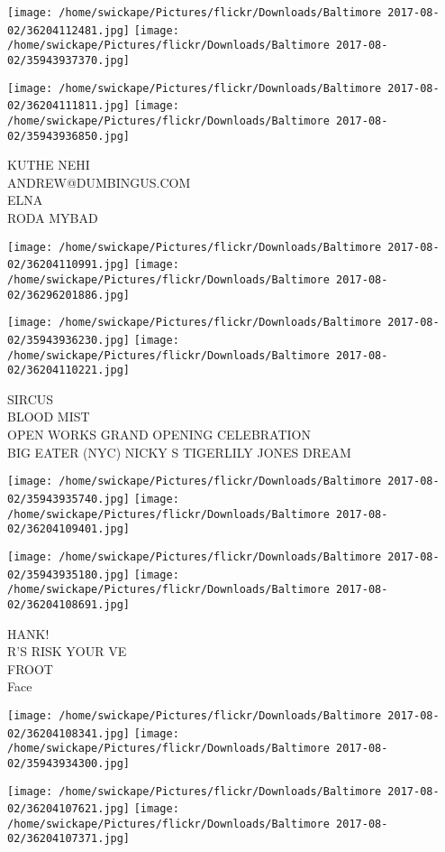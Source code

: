 \documentclass[10pt,letterpaper]{article}
\begin{document}
\texttt{[image: /home/swickape/Pictures/flickr/Downloads/Baltimore 2017-08-02/36204112481.jpg]}
\texttt{[image: /home/swickape/Pictures/flickr/Downloads/Baltimore 2017-08-02/35943937370.jpg]}

\texttt{[image: /home/swickape/Pictures/flickr/Downloads/Baltimore 2017-08-02/36204111811.jpg]}
\texttt{[image: /home/swickape/Pictures/flickr/Downloads/Baltimore 2017-08-02/35943936850.jpg]}

KUTHE NEHI\\
ANDREW@DUMBINGUS.COM\\
ELNA\\
RODA MYBAD
\pagebreak

\texttt{[image: /home/swickape/Pictures/flickr/Downloads/Baltimore 2017-08-02/36204110991.jpg]}
\texttt{[image: /home/swickape/Pictures/flickr/Downloads/Baltimore 2017-08-02/36296201886.jpg]}

\texttt{[image: /home/swickape/Pictures/flickr/Downloads/Baltimore 2017-08-02/35943936230.jpg]}
\texttt{[image: /home/swickape/Pictures/flickr/Downloads/Baltimore 2017-08-02/36204110221.jpg]}

SIRCUS\\
BLOOD MIST\\
OPEN WORKS GRAND OPENING CELEBRATION\\
BIG EATER (NYC) NICKY S TIGERLILY JONES DREAM
\pagebreak

\texttt{[image: /home/swickape/Pictures/flickr/Downloads/Baltimore 2017-08-02/35943935740.jpg]}
\texttt{[image: /home/swickape/Pictures/flickr/Downloads/Baltimore 2017-08-02/36204109401.jpg]}

\texttt{[image: /home/swickape/Pictures/flickr/Downloads/Baltimore 2017-08-02/35943935180.jpg]}
\texttt{[image: /home/swickape/Pictures/flickr/Downloads/Baltimore 2017-08-02/36204108691.jpg]}

HANK!\\
R'S RISK YOUR VE\\
FROOT\\
Face
\pagebreak

\texttt{[image: /home/swickape/Pictures/flickr/Downloads/Baltimore 2017-08-02/36204108341.jpg]}
\texttt{[image: /home/swickape/Pictures/flickr/Downloads/Baltimore 2017-08-02/35943934300.jpg]}

\texttt{[image: /home/swickape/Pictures/flickr/Downloads/Baltimore 2017-08-02/36204107621.jpg]}
\texttt{[image: /home/swickape/Pictures/flickr/Downloads/Baltimore 2017-08-02/36204107371.jpg]}
\end{document}
